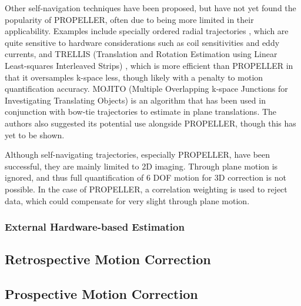 \documentclass[class=article, crop=false]{standalone}
\begin{document}
Other self-navigation techniques have been proposed, but have not yet found the popularity of PROPELLER, often due to being more limited in their applicability. Examples include specially ordered radial trajectories \parencite{Welch2004a,Kim2008,Anderson2011}, which are quite sensitive to hardware considerations such as coil sensitivities and eddy currents, and TRELLIS (Translation and Rotation Estimation using Linear Least-squares Interleaved Strips) \parencite{Maclaren2008}, which is more efficient than PROPELLER in that it oversamples k-space less, though likely with a penalty to motion quantification accuracy. MOJITO (Multiple Overlapping k-space Junctions for Investigating Translating Objects) \parencite{Bookwalter2010} is an algorithm that has been used in conjunction with bow-tie trajectories to estimate in plane translations. The authors also suggested its potential use alongside PROPELLER, though this has yet to be shown.
\par 
Although self-navigating trajectories, especially PROPELLER, have been successful, they are mainly limited to 2D imaging. Through plane motion is ignored, and thus full quantification of 6 DOF motion for 3D correction is not possible. In the case of PROPELLER, a correlation weighting is used to reject data, which could compensate for very slight through plane motion.

\subsubsection{External Hardware-based Estimation}

\subsection{Retrospective Motion Correction}

\subsection{Prospective Motion Correction}
\end{document}
